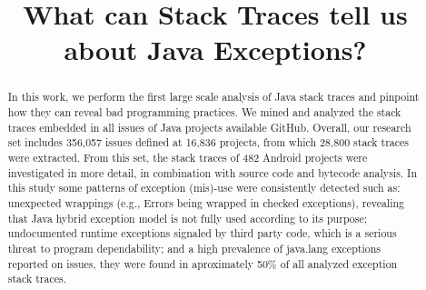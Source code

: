 \documentclass[conference]{IEEEtran}
\begin{document}
\title{ What can Stack Traces tell us about Java Exceptions? }



\author{
}

\newcommand{\todo}[1]{\textbf{TODO}\footnote{\textbf{TODO:} #1}}

\maketitle

\begin{abstract}

In this work, we perform the first large scale analysis of Java stack traces and
pinpoint how they can reveal bad programming practices. We mined and analyzed
the stack traces embedded in all issues of Java projects available GitHub.
Overall, our research set includes 356,057 issues defined at 16,836 projects, 
from which 28,800 stack traces were extracted. From this set, the stack traces
of 482 Android projects were investigated in more detail, in combination with
source code and bytecode analysis. In this study some patterns of exception
(mis)-use were consistently detected such as: unexpected wrappings (e.g., Errors
being wrapped in checked exceptions), revealing that Java hybrid exception
model is not fully used according to its purpose;  undocumented runtime
exceptions signaled by third party code, which is a serious threat to program
dependability; and a high prevalence of java.lang exceptions reported on issues,  
they were found in aproximately 50\% of all analyzed exception stack traces.


\end{abstract}

\end{document}
